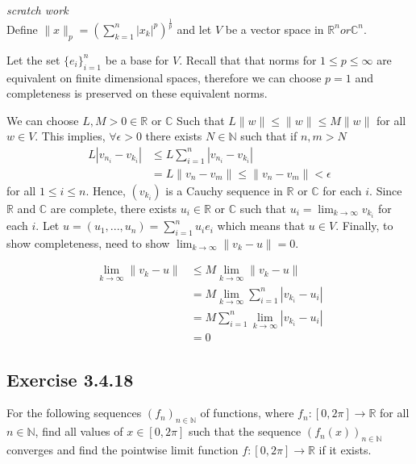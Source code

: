 \documentclass{tufte-book}
\theoremstyle{mytheoremstyle}
\theoremstyle{mylemstyle}
\theoremstyle{mydefstyle}
\begin{document}
\textit{scratch work} \\
Define $\|x\|_p = (\sum_{k=1}^n |x_k|^p)^\frac{1}{p}$ and let $V$ be a vector space in $\mathbb{R}^n or \mathbb{C}^n$.

Let the set $\{e_i\}_{i=1}^n$ be a base for $V$.  Recall that that norms for $1 \leq p \leq \infty$ are equivalent on finite dimensional spaces, therefore we can choose $p=1$ and completeness is preserved on these equivalent norms.

We can choose $L,M>0 \in \mathbb{R}$ or $\mathbb{C}$ Such that $L\|w\| \leq \|w\| \leq M\|w\|$ for all $w \in V$.  This implies, $\forall \epsilon >0$ there exists $N \in \mathbb{N}$ such that if $n,m > N$
\begin{align*}
L|v_{n_{i}} - v_{k_{i}}| &\leq L \sum_{i=1}^n|v_{n_{i}} - v_{k_{i}}|\\
&= L\|v_n - v_m\| \leq \|v_n - v_m\|< \epsilon
\end{align*}
for all $1 \leq i \leq n$.  Hence, $(v_{k_{i}})$ is a Cauchy sequence in $\mathbb{R}$ or $\mathbb{C}$ for each $i$.  Since $\mathbb{R}$ and $\mathbb{C}$ are complete, there exists $u_i \in \mathbb{R}$ or $\mathbb{C}$ such that $u_i = \lim_{k \to \infty}v_{k_{i}}$ for each $i$.
Let $u=(u_1,...,u_n) = \sum_{i=1}^n u_ie_i$ which means that $u \in V$.  Finally, to show completeness, need to show $\lim_{k \to \infty}\|v_k - u\| = 0$.

\begin{align*}
\lim_{k \to \infty}\|v_k - u\| &\leq M \lim_{k \to \infty}\|v_k - u\|\\
&= M \lim_{k \to \infty} \sum_{i=1}^n|v_{k_{i}} - u_i| \\
&= M \sum_{i=1}^n \lim_{k \to \infty} |v_{k_{i}} - u_i| \\
&= 0
\end{align*}


\subsection{Exercise 3.4.18}
For the following sequences $(f_n)_{n \in \mathbb{N}}$ of functions, where $f_n:[0,2\pi] \rightarrow \mathbb{R}$ for all $n \in \mathbb{N}$, find all values of $x \in [0, 2\pi]$ such that the sequence $(f_n(x))_{n \in \mathbb{N}}$ converges and find the pointwise limit function $f: [0,2\pi] \rightarrow \mathbb{R}$ if it exists.
\end{document}
